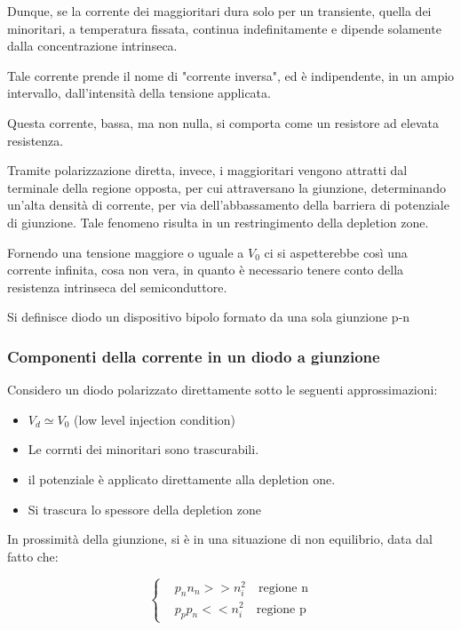 \documentclass{article}
\begin{document}
Dunque, se la corrente dei maggioritari dura solo per un transiente, quella dei minoritari, a temperatura fissata, continua indefinitamente e dipende solamente dalla concentrazione intrinseca.

Tale corrente prende il nome di "corrente inversa", ed è indipendente, in un ampio intervallo, dall'intensità della tensione applicata.

Questa corrente, bassa, ma non nulla, si comporta come un resistore ad elevata resistenza.

Tramite polarizzazione diretta, invece, i maggioritari vengono attratti dal terminale della regione opposta, per cui attraversano la giunzione, determinando un'alta densità di corrente,
per via dell'abbassamento della barriera di potenziale di giunzione.
Tale fenomeno risulta in un restringimento della depletion zone.

Fornendo una tensione maggiore o uguale a $V_0$ ci si aspetterebbe così una corrente infinita, cosa non vera, in quanto è necessario tenere conto
della resistenza intrinseca del semiconduttore.

Si definisce diodo un dispositivo bipolo formato da una sola giunzione p-n

\subsubsection{Componenti della corrente in un diodo a giunzione}

Considero un diodo polarizzato direttamente sotto le seguenti approssimazioni:

\begin{itemize}
    \item $V_d \simeq V_0$ (low level injection condition)
    \item Le corrnti dei minoritari sono trascurabili.
    \item il potenziale è applicato direttamente alla depletion one.
    \item Si trascura lo spessore della depletion zone
\end{itemize}

In prossimità della giunzione, si è in una situazione di non equilibrio, data dal fatto che:

\begin{equation}
    \left\{
    \begin{aligned}
         & p_nn_n>>n_i^2 \quad \text{regione n} \\
         & p_pp_n<<n_i^2 \quad \text{regione p}
    \end{aligned}
    \right.
\end{equation}
\end{document}
